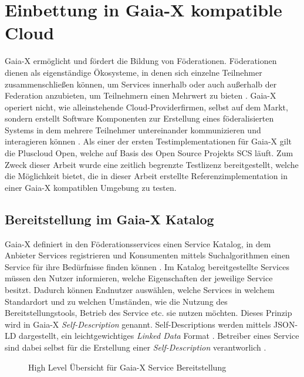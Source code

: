 \chapter{Einbettung in Gaia-X kompatible Cloud}
\label{chapter:gaia-x-einbettung}
Gaia-X ermöglicht und fördert die Bildung von Föderationen.
Föderationen dienen als eigenständige Ökosysteme, in denen sich einzelne Teilnehmer zusammenschließen können,
um Services innerhalb oder auch außerhalb der Federation anzubieten, um Teilnehmern einen Mehrwert zu bieten \cite{GXFS2021}.
Gaia-X operiert nicht, wie alleinstehende Cloud-Providerfirmen, selbst auf dem Markt, sondern erstellt
Software Komponenten zur Erstellung eines föderalisierten Systems in dem mehrere Teilnehmer
untereinander kommunizieren und interagieren können \cite{GXFS2021}.
Als einer der ersten Testimplementationen für Gaia-X gilt die Pluscloud Open,
welche auf Basis des Open Source Projekts \ac{SCS} läuft.
Zum Zweck dieser Arbeit wurde eine zeitlich begrenzte Testlizenz bereitgestellt,
welche die Möglichkeit bietet, die in dieser Arbeit erstellte Referenzimplementation
in einer Gaia-X kompatiblen Umgebung zu testen.


\section{Bereitstellung im Gaia-X Katalog}
\label{sec:gaia-x-einbettung:gaia-x-katalog}
Gaia-X definiert in den Föderationsservices einen Service Katalog, in dem Anbieter Services registrieren
und Konsumenten mittels Suchalgorithmen einen Service für ihre Bedürfnisse finden können \cite{GaiaXArchitecture2021}.
Im Katalog bereitgestellte Services müssen den Nutzer informieren, welche Eigenschaften der jeweilige Service besitzt.
Dadurch können Endnutzer auswählen, welche Services in welchem Standardort 
und zu welchen Umständen, wie die Nutzung des Bereitstellungstools, Betrieb des Service etc. sie nutzen möchten.
Dieses Prinzip wird in Gaia-X \emph{Self-Description} genannt.
Self-Descriptions werden mittels JSON-LD dargestellt, ein
leichtgewichtiges \emph{Linked Data} Format \cite{Eggers2020}.
Betreiber eines Service sind dabei selbst für die Erstellung einer \emph{Self-Description} verantworlich \cite{GaiaXArchitecture2021}.

\begin{figure}
  \centering
  \caption{High Level Übersicht für Gaia-X Service Bereitstellung}
  \label{fig:gaia-x-orchestration-overview}
\end{figure}

